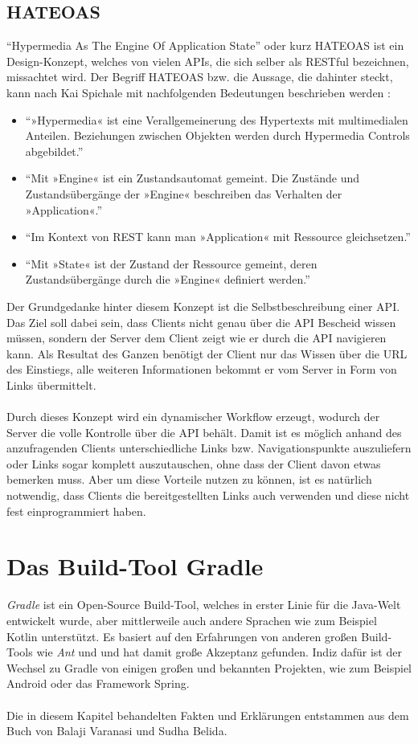 \subsection{HATEOAS}
\enquote{Hypermedia As The Engine Of Application State} oder kurz HATEOAS ist ein Design-Konzept, welches von vielen \glspl{API}, die sich selber als \gls{REST}ful bezeichnen, missachtet wird. \cite{restMustBeHypertextDriven} Der Begriff HATEOAS bzw. die Aussage, die dahinter steckt, kann nach Kai Spichale mit nachfolgenden Bedeutungen beschrieben werden \cite[156]{apiDesign}:
\begin{itemize}
	\item \enquote{»Hypermedia« ist eine Verallgemeinerung des Hypertexts mit multimedialen Anteilen. Beziehungen zwischen Objekten werden durch
		Hypermedia Controls abgebildet.}
	\item \enquote{Mit »Engine« ist ein Zustandsautomat gemeint. Die Zustände und
		Zustandsübergänge der »Engine« beschreiben das Verhalten der
		»Application«.}
	\item \enquote{Im Kontext von REST kann man »Application« mit Ressource
		gleichsetzen.}
	\item \enquote{Mit »State« ist der Zustand der Ressource gemeint, deren Zustandsübergänge durch die »Engine« definiert werden.}
\end{itemize}
Der Grundgedanke hinter diesem Konzept ist die Selbstbeschreibung einer \gls{API}. Das Ziel soll dabei sein, dass Clients nicht genau über die \gls{API} Bescheid wissen müssen, sondern der Server dem Client zeigt wie er durch die \gls{API} navigieren kann. Als Resultat des Ganzen benötigt der Client nur das Wissen über die \gls{URL} des Einstiegs, alle weiteren Informationen bekommt er vom Server in Form von Links übermittelt.\\
\\
Durch dieses Konzept wird ein dynamischer Workflow erzeugt, wodurch der Server die volle Kontrolle über die \gls{API} behält. Damit ist es möglich anhand des anzufragenden Clients unterschiedliche Links bzw. Navigationspunkte auszuliefern oder Links sogar komplett auszutauschen, ohne dass der Client davon etwas bemerken muss. Aber um diese Vorteile nutzen zu können, ist es natürlich notwendig, dass Clients die bereitgestellten Links auch verwenden und diese nicht fest einprogrammiert haben.

\section{Das Build-Tool Gradle}
\textit{Gradle} ist ein Open-Source Build-Tool, welches in erster Linie für die Java-Welt entwickelt wurde, aber mittlerweile auch andere Sprachen wie zum Beispiel Kotlin unterstützt. Es basiert auf den Erfahrungen von anderen großen Build-Tools wie \textit{Ant} und  und hat damit große Akzeptanz gefunden. Indiz dafür ist der Wechsel zu Gradle von einigen großen und bekannten Projekten, wie zum Beispiel Android oder das Framework Spring.\\
\\
Die in diesem Kapitel behandelten Fakten und Erklärungen entstammen aus dem Buch \cite{introducingGradle} von Balaji Varanasi und Sudha Belida.

